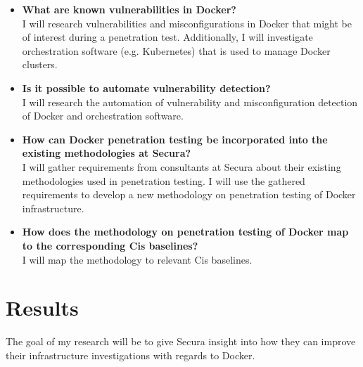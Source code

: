\documentclass{article}
\begin{document}
\begin{itemize}
    \item \textbf{What are known vulnerabilities in Docker?}\\
    I will research vulnerabilities and misconfigurations in Docker that might be of interest during a penetration test. Additionally, I will investigate orchestration software (e.g. Kubernetes) that is used to manage Docker clusters.

    \item \textbf{Is it possible to automate vulnerability detection?}\\
    I will research the automation of vulnerability and misconfiguration detection of Docker and orchestration software.

    \item \textbf{How can Docker penetration testing be incorporated into the existing methodologies at Secura?}\\
    I will gather requirements from consultants at Secura about their existing methodologies used in penetration testing. I will use the gathered requirements to develop a new methodology on penetration testing of Docker infrastructure.

    \item \textbf{How does the methodology on penetration testing of Docker map to the corresponding Cis baselines?}\\
    I will map the methodology to relevant Cis baselines.
\end{itemize}

\section{Results}
The goal of my research will be to give Secura insight into how they can improve their infrastructure investigations with regards to Docker.
\end{document}
